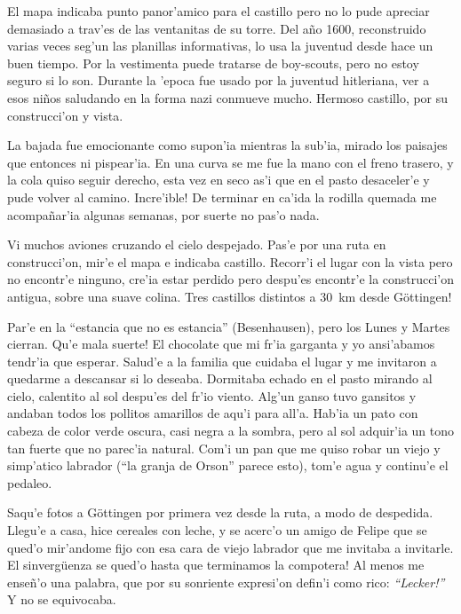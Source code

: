El mapa indicaba punto panor'amico para el castillo pero no lo pude apreciar
demasiado a trav'es de las ventanitas de su torre. Del a\~no 1600, reconstruido
varias veces seg'un las planillas informativas, lo usa la juventud desde hace un
buen tiempo. Por la vestimenta puede tratarse de boy-scouts, pero no estoy
seguro si lo son. Durante la 'epoca fue usado por la juventud hitleriana, ver a
esos ni\~nos saludando en la forma nazi conmueve mucho. Hermoso castillo, por su
construcci'on y vista.

La bajada fue emocionante como supon'ia mientras la sub'ia, mirado los
paisajes que entonces ni pispear'ia. En una curva se me fue la mano con el freno
trasero, y la cola quiso seguir derecho, esta vez en seco as'i que en el pasto
desaceler'e y pude volver al camino. \textexclamdown Incre'ible! De terminar en
ca'ida la rodilla quemada me acompa\~nar'ia algunas semanas, por suerte no pas'o
nada.

Vi muchos aviones cruzando el cielo despejado. Pas'e por una ruta en
construcci'on, mir'e el mapa e indicaba castillo. Recorr'i el lugar con la vista
pero no encontr'e ninguno, cre'ia estar perdido pero despu'es encontr'e la
construcci'on antigua, sobre una suave colina. \textexclamdown Tres castillos
distintos a 30~km desde G\"ottingen!

Par'e en la ``estancia que no es estancia'' (Besenhausen), pero los Lunes y
Martes cierran. \textexclamdown Qu'e mala suerte! El chocolate que mi fr'ia
garganta y yo ansi'abamos tendr'ia que esperar. Salud'e a la familia que cuidaba
el lugar y me invitaron a quedarme a descansar si lo deseaba. Dormitaba echado
en el pasto mirando al cielo, calentito al sol despu'es del fr'io viento. Alg'un
ganso tuvo gansitos y andaban todos los pollitos amarillos de aqu'i para all'a.
Hab'ia un pato con cabeza de color verde oscura, casi negra a la sombra, pero al
sol adquir'ia un tono tan fuerte que no parec'ia natural. Com'i un pan que me
quiso robar un viejo y simp'atico labrador (``la granja de Orson'' parece esto),
tom'e agua y continu'e el pedaleo.

Saqu'e fotos a G\"ottingen por primera vez desde la ruta, a modo de despedida.
Llegu'e a casa, hice cereales con leche, y se acerc'o un amigo de Felipe que se
qued'o mir'andome fijo con esa cara de viejo labrador que me invitaba a
invitarle. \textexclamdown El sinverg\"uenza se qued'o hasta que terminamos la
compotera! Al menos me ense\~n'o una palabra, que por su sonriente expresi'on
defin'i como rico: {\sl ``Lecker!''} Y no se equivocaba.

